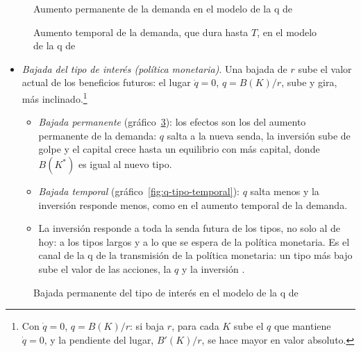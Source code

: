\documentclass[11pt]{article}
\begin{document}
\begin{figure}[H]
\centering
\caption{Aumento permanente de la demanda en el modelo de la q de }\label{fig:q-permanente}
\end{figure}

\begin{figure}[H]
\centering
\caption{Aumento temporal de la demanda, que dura hasta $T$, en el modelo de la q de }\label{fig:q-temporal}
\end{figure}

\begin{itemize}
\item \emph{Bajada del tipo de interés (política monetaria)}. Una bajada de $r$ sube el valor actual de los beneficios futuros: el lugar $\dot q=0$, $q=B(K)/r$, sube y gira, más inclinado.\footnote{Con $\dot q=0$, $q=B(K)/r$: si baja $r$, para cada $K$ sube el $q$ que mantiene $\dot q=0$, y la pendiente del lugar, $B'(K)/r$, se hace mayor en valor absoluto.}
  \begin{itemize}
  \item \emph{Bajada permanente} (gráfico~\ref{fig:q-tipo-permanente}): los efectos son los del aumento permanente de la demanda: $q$ salta a la nueva senda, la inversión sube de golpe y el capital crece hasta un equilibrio con más capital, donde $B(K^*)$ es igual al nuevo tipo.
  \item \emph{Bajada temporal} (gráfico~\ref{fig:q-tipo-temporal}): $q$ salta menos y la inversión responde menos, como en el aumento temporal de la demanda.
  \item La inversión responde a toda la senda futura de los tipos, no solo al de hoy: a los tipos largos y a lo que se espera de la política monetaria. Es el canal de la q de la transmisión de la política monetaria: un tipo más bajo sube el valor de las acciones, la $q$ y la inversión .
  \end{itemize}
\end{itemize}

\begin{figure}[H]
\centering
\caption{Bajada permanente del tipo de interés en el modelo de la q de }\label{fig:q-tipo-permanente}
\end{figure}
\end{document}
